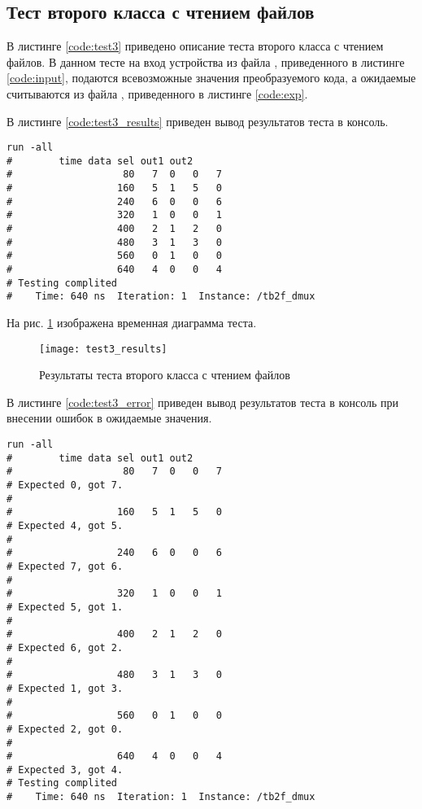 \subsection{Тест второго класса с чтением файлов}

В листинге \ref{code:test3} приведено описание теста второго класса с чтением файлов. В данном тесте на вход устройства из файла , приведенного в листинге \ref{code:input}, подаются всевозможные значения преобразуемого кода, а ожидаемые считываются из файла , приведенного в листинге \ref{code:exp}. 

	


В листинге \ref{code:test3_results} приведен вывод результатов теста в консоль.
\begin{lstlisting}[caption=Результаты теста второго класса с чтением файлов, label=code:test3_results, style=console]
run -all
# 		 time data sel out1 out2
#                   80   7  0   0   7
#                  160   5  1   5   0
#                  240   6  0   0   6
#                  320   1  0   0   1
#                  400   2  1   2   0
#                  480   3  1   3   0
#                  560   0  1   0   0
#                  640   4  0   0   4
# Testing complited
#    Time: 640 ns  Iteration: 1  Instance: /tb2f_dmux
\end{lstlisting}

На рис. \ref{fig:test3_results} изображена временная диаграмма теста.
\begin{figure}[H]
	\begin{center}
		\texttt{[image: test3\_results]}
		\caption{Результаты теста второго класса с чтением файлов}
		\label{fig:test3_results}
	\end{center}
\end{figure}

В листинге \ref{code:test3_error} приведен вывод результатов теста в консоль при внесении ошибок в ожидаемые значения.
\begin{lstlisting}[caption=Результаты ошибочного теста второго класса с чтением файлов, label=code:test3_error, style=console]
run -all
# 		 time data sel out1 out2
#                   80   7  0   0   7
# Expected 0, got 7.
# 
#                  160   5  1   5   0
# Expected 4, got 5.
# 
#                  240   6  0   0   6
# Expected 7, got 6.
# 
#                  320   1  0   0   1
# Expected 5, got 1.
# 
#                  400   2  1   2   0
# Expected 6, got 2.
# 
#                  480   3  1   3   0
# Expected 1, got 3.
# 
#                  560   0  1   0   0
# Expected 2, got 0.
# 
#                  640   4  0   0   4
# Expected 3, got 4.
# Testing complited
#    Time: 640 ns  Iteration: 1  Instance: /tb2f_dmux
\end{lstlisting}

